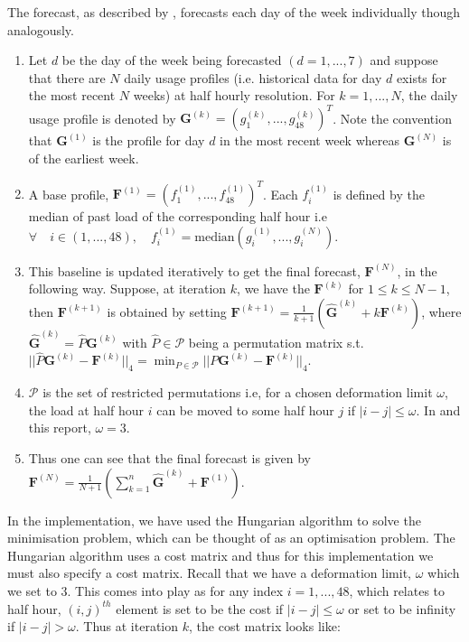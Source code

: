 \documentclass[a4paper]{article}
\begin{document}
The forecast, as described by \cite{dan14}, forecasts each day of the week individually though analogously.
\begin{enumerate}[label=\roman*)]
\item Let $d$ be the day of the week being forecasted $(d=1,...,7)$ and suppose that there are $N$ daily usage profiles (i.e. historical data for day $d$ exists for the most recent $N$ weeks) at half hourly resolution. For $k = 1, ..., N$, the daily usage profile is denoted by $\boldsymbol{G}^{(k)} = (g_1^{(k)}, ... , g_{48}^{(k)})^T$. Note the convention that $\boldsymbol{G}^{(1)}$ is the profile for day $d$ in the most recent week whereas $\boldsymbol{G}^{(N)}$ is of the earliest week.
\item A base profile, $\boldsymbol{F}^{(1)} = \left(f_1^{(1)}, ... , f_{48}^{(1)} \right)^T$. Each $f_i^{(1)}$ is defined by the median of past load of the corresponding half hour i.e $ \forall \quad i \in (1, ..., 48), \quad f_i^{(1)} = \text{median}(g_i^{(1)}, ..., g_i^{(N)})$.
\item This baseline is updated iteratively to get the final forecast, $\boldsymbol{F}^{(N)}$, in the following way. Suppose, at iteration $k$, we have the $\boldsymbol{F}^{(k)}$ for $1 \le k \le N-1$, then $\boldsymbol{F}^{(k+1)}$ is obtained by setting $\boldsymbol{F}^{(k+1)} = \frac{1}{k+1} \left( \boldsymbol{\hat{G}}^{(k)} + k \boldsymbol{F}^{(k)}\right)$, where $\boldsymbol{\hat{G}}^{(k)} = \hat{P}\boldsymbol{G}^{(k)}$ with $\hat{P} \in  \mathscr{P}$ being a permutation matrix s.t. $||\hat{P}\boldsymbol{G}^{(k)} - \boldsymbol{F}^{(k)}||_4 = \displaystyle \min_{P \in \mathscr{P}}||P\boldsymbol{G}^{(k)} - \boldsymbol{F}^{(k)}||_4 $.
\item $\mathscr{P}$ is the set of restricted permutations i.e, for a chosen deformation limit $\omega$, the load at half hour $i$ can be moved to some half hour $j$ if $|i-j| \le \omega$. In \cite{dan14} and this report, $\omega=3$.
\item Thus one can see that the final forecast is given by $\boldsymbol{F}^{(N)} = \frac{1}{N+1}\left(\displaystyle \sum_{k=1}^n \boldsymbol{\hat{G}}^{(k)} + \boldsymbol{F}^{(1)} \right)$.
\end{enumerate}

In the implementation, we have used the Hungarian algorithm to solve the minimisation problem, which can be thought of as an optimisation problem. The Hungarian algorithm uses a cost matrix and thus for this implementation we must also specify a cost matrix. Recall that we have a deformation limit, $\omega$ which we set to 3. This comes into play as for any index $i = 1, ..., 48$, which relates to half hour, $(i,j)^{th}$ element is set to be the cost if $|i-j|\le\omega$ or set to be infinity if $|i-j| > \omega$. Thus at iteration $k$, the cost matrix looks like: \newline
\end{document}
